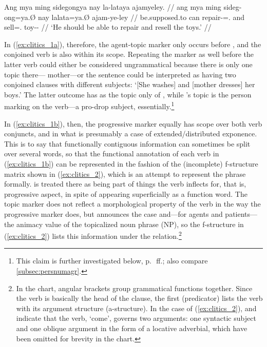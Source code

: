 \a\label{ex:clitics_1c}\begingl
	\gla Ang mya ming sidegongya nay la-lataya ajamyeley. //
	\glb ang mya ming sideg-ong=ya.Ø nay la\til{}lata=ya.Ø ajam-ye-ley //
	\glc \AgtT{} be.supposed.to can repair-\Irr{}=\TsgM{}.\Top{} and
		\Iter{}\til{}sell=\TsgM{}.\Top{} toy-\Pl{}-\PargI{} //
	\glft `He should be able to repair and resell the toys.' //
\endgl
\xe

In (\ref{ex:clitics_1a}), therefore, the agent-topic  marker
 only occurs before , and the
conjoined verb  is also within its
scope. Repeating the marker as well before the latter verb could either be
considered ungrammatical because there is only one topic
there--- {mother}---or the sentence could be interpreted as
having two conjoined clauses with different subjects: `[She washes] and [mother
dresses] her boys.' The latter outcome has  as the topic only
of , while 's topic is the person
marking on the verb---a pro-drop subject, essentially.\footnote{This claim is
further investigated below, p.~\pageref{subsubsec:suffixes}\,ff.; also compare
\autoref{subsec:persnumagr}.}

In (\ref{ex:clitics_1b}), then, the progressive marker  
 equally has scope over both verb conjuncts,
 and  in what is
presumably a case of extended/distributed exponence. This is to say that
functionally contiguous information can sometimes be split over several words,
so that the functional annotation of each verb in (\ref{ex:clitics_1b}) can be
represented in the fashion of the (incomplete) f-structure matrix
\parencites[see][]{bresnan2016}{buttking2015} shown in (\ref{ex:clitics_2}),
which is an attempt to represent the phrase  formally.  is treated there as being part of
things the verb inflects for, that is, progressive aspect, in spite of
appearing superficially as a function word. The topic marker 
does not reflect a morphological property of the verb in the way the
progressive marker does, but announces the case and---for agents and 
patients---the animacy value of the topicalized noun phrase (NP), so the
f-structure in (\ref{ex:clitics_2}) lists this information under the \Top{}
relation.\footnote{In the chart, angular brackets group grammatical functions
together. Since the verb is basically the head of the clause, the first \Pred{}
(predicator) lists the verb with its argument structure (a-structure). In the
case of (\ref{ex:clitics_2}), \ups{\Sbj{}} and  indicate that
the verb, `come', governs two arguments: one syntactic subject and one oblique
argument in the form of a locative adverbial, which have been omitted for
brevity in the chart.}

